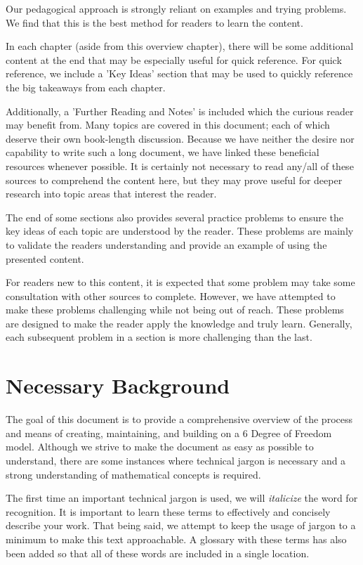 \documentclass[12pt]{report}
\begin{document}
Our pedagogical approach is strongly reliant on examples and trying problems. We find that this is the best method for readers to learn the content.

In each chapter (aside from this overview chapter), there will be some additional content at the end that may be especially useful for quick reference. For quick reference, we include a 'Key Ideas' section that may be used to quickly reference the big takeaways from each chapter.

Additionally, a  'Further Reading and Notes' is included which the curious reader may benefit from. Many topics are covered in this document; each of which deserve their own book-length discussion. Because we have neither the desire nor capability to write such a long document, we have linked these beneficial resources whenever possible. It is certainly not necessary to read any/all of these sources to comprehend the content here, but they may prove useful for deeper research into topic areas that interest the reader.

The end of some sections also provides several practice problems to ensure the key ideas of each topic are understood by the reader. These problems are mainly to validate the readers understanding and provide an example of using the presented content.

For readers new to this content, it is expected that some problem may take some consultation with other sources to complete. However, we have attempted to make these problems challenging while not being out of reach. These problems are designed to make the reader apply the knowledge and truly learn. Generally, each subsequent problem in a section is more challenging than the last.

\section{Necessary Background}
The goal of this document is to provide a comprehensive overview of the process and means of creating, maintaining, and building on a 6 Degree of Freedom model. Although we strive to make the document as easy as possible to understand, there are some instances where technical jargon is necessary and a strong understanding of mathematical concepts is required. 

The first time an important technical jargon is used, we will \textit{italicize} the word for recognition. It is important to learn these terms to effectively and concisely describe your work. That being said, we attempt to keep the usage of jargon to a minimum to make this text approachable. A glossary with these terms has also been added so that all of these words are included in a single location. 
\end{document}
